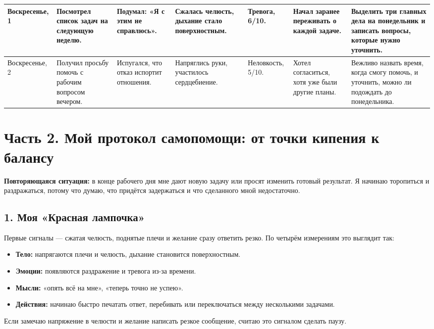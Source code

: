 \documentclass[10pt,a4paper]{article}
\begin{document}
\begin{longtable}{|p{19mm}|p{39mm}|p{37mm}|p{31mm}|p{20mm}|p{35mm}|p{51mm}|}
Воскресенье, 1 & Посмотрел список задач на следующую неделю. & Подумал: «Я с этим не справлюсь». & Сжалась челюсть, дыхание стало поверхностным. & Тревога, 6/10. & Начал заранее переживать о каждой задаче. & Выделить три главных дела на понедельник и записать вопросы, которые нужно уточнить.\\\hline
Воскресенье, 2 & Получил просьбу помочь с рабочим вопросом вечером. & Испугался, что отказ испортит отношения. & Напряглись руки, участилось сердцебиение. & Неловкость, 5/10. & Хотел согласиться, хотя уже были другие планы. & Вежливо назвать время, когда смогу помочь, и уточнить, можно ли подождать до понедельника.\\\hline
\end{longtable}
\endgroup

\clearpage
\section*{Часть 2. Мой протокол самопомощи: от точки кипения к балансу}

\textbf{Повторяющаяся ситуация:} в конце рабочего дня мне дают новую задачу или просят изменить готовый результат. Я начинаю торопиться и раздражаться, потому что думаю, что придётся задержаться и что сделанного мной недостаточно.

\subsection*{1. Моя «Красная лампочка»}

Первые сигналы — сжатая челюсть, поднятые плечи и желание сразу ответить резко. По четырём измерениям это выглядит так:

\begin{itemize}[leftmargin=*,itemsep=3pt,topsep=3pt]
\item \textbf{Тело:} напрягаются плечи и челюсть, дыхание становится поверхностным.
\item \textbf{Эмоции:} появляются раздражение и тревога из-за времени.
\item \textbf{Мысли:} «опять всё на мне», «теперь точно не успею».
\item \textbf{Действия:} начинаю быстро печатать ответ, перебивать или переключаться между несколькими задачами.
\end{itemize}

Если замечаю напряжение в челюсти и желание написать резкое сообщение, считаю это сигналом сделать паузу.
\end{document}
